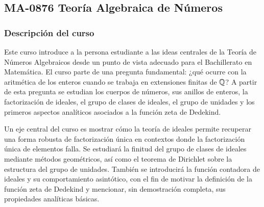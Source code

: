 \newpage
\subsection*{MA-0876 Teoría Algebraica de Números}

\hypertarget{MA0876}{}
\begin{refsection}
\begin{table}[H]
\end{table}



\subsubsection*{Descripción del curso}

Este curso introduce a la persona estudiante a las ideas centrales de la Teoría de Números Algebraicos desde un punto de vista adecuado para el Bachillerato en Matemática. El curso parte de una pregunta fundamental: ¿qué ocurre con la aritmética de los enteros cuando se trabaja en extensiones finitas de $\mathbb{Q}$? A partir de esta pregunta se estudian los cuerpos de números, sus anillos de enteros, la factorización de ideales, el grupo de clases de ideales, el grupo de unidades y los primeros aspectos analíticos asociados a la función zeta de Dedekind.

Un eje central del curso es mostrar cómo la teoría de ideales permite recuperar una forma robusta de factorización única en contextos donde la factorización única de elementos falla. Se estudiará la finitud del grupo de clases de ideales mediante métodos geométricos, así como el teorema de Dirichlet sobre la estructura del grupo de unidades. También se introducirá la función contadora de ideales y su comportamiento asintótico, con el fin de motivar la definición de la función zeta de Dedekind y mencionar, sin demostración completa, sus propiedades analíticas básicas.


\end{refsection}
